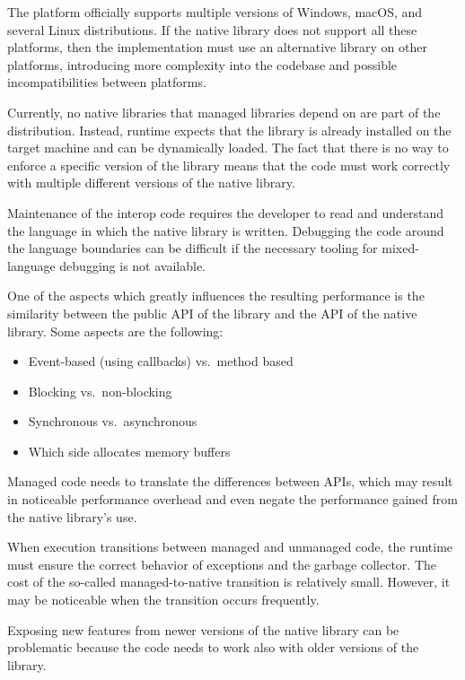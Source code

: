 \begin{itemize}

     The \dotnet{} platform officially supports
    multiple versions of Windows, macOS, and several Linux distributions. If the native library does
    not support all these platforms, then the implementation must use an alternative library on
    other platforms, introducing more complexity into the codebase and possible incompatibilities
    between platforms.

     Currently, no native libraries that managed
    \dotnet{} libraries depend on are part of the \dotnet{} distribution. Instead, \dotnet{} runtime
    expects that the library is already installed on the target machine and can be dynamically
    loaded. The fact that there is no way to enforce a specific version of the library means that
    the \dotnet{} code must work correctly with multiple different versions of the native library.

     Maintenance of the interop code requires the developer to read and
    understand the language in which the native library is written. Debugging the code around the
    language boundaries can be difficult if the necessary tooling for mixed-language debugging is
    not available.

     One of the aspects which greatly influences the resulting performance is
    the similarity between the public API of the \dotnet{} library and the API of the native
    library. Some aspects are the following:

    \begin{itemize}
      \item Event-based (using callbacks) vs.\ method based
      \item Blocking vs.\ non-blocking
      \item Synchronous vs.\ asynchronous
      \item Which side allocates memory buffers
    \end{itemize}

    Managed code needs to translate the differences between APIs, which may result in noticeable
    performance overhead and even negate the performance gained from the native library's use.

     When execution transitions between managed and unmanaged code,
    the runtime must ensure the correct behavior of exceptions and the garbage collector. The cost
    of the so-called managed-to-native transition is relatively small. However, it may be noticeable
    when the transition occurs frequently.

     Exposing new features from newer versions of the native library can
    be problematic because the code needs to work also with older versions of the library.

\end{itemize}

